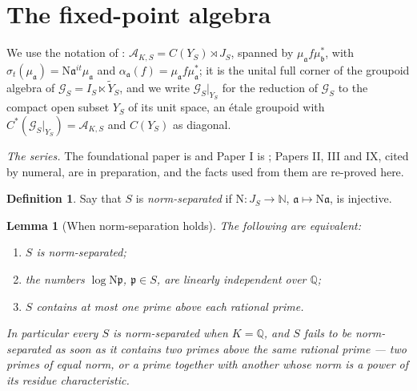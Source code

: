 \documentclass[11pt]{amsart}
\numberwithin{equation}{section}
\newtheorem{lemma}[theorem]{Lemma}
\theoremstyle{definition}
\newtheorem{definition}[theorem]{Definition}
\theoremstyle{remark}
\newcommand{\Q}{\mathbb{Q}}
\newcommand{\R}{\mathbb{R}}
\newcommand{\N}{\mathbb{N}}
\newcommand{\cA}{\mathcal{A}}
\newcommand{\cG}{\mathcal{G}}
\newcommand{\pp}{\mathfrak{p}}
\newcommand{\aaa}{\mathfrak{a}}
\newcommand{\bb}{\mathfrak{b}}
\newcommand{\Ns}{\mathrm{N}}
\begin{document}
\begin{abstract}
We are careful about what is \emph{not} recovered. The system sees only the triple
$\bigl(S,\Ns|_S,G_S\bigr)$ with its Frobenius data; the field $K$ enters only through that
triple, and whether the triple determines $K$ is an arithmetic question we do not settle and
which, for $S=P_K$, belongs to the literature on Bost--Connes reconstruction. The narrow class
number is not recovered by any argument here. The KMS bundle is a weaker invariant than the
groupoid: it sees the simplices and their symmetry, but we see no way to extract the
individual norms from it. Finally, the proposed equivariant classification of the Kirchberg
boundary by $KK_\R$ is not available to us: the classification of flows on Kirchberg algebras
up to cocycle conjugacy is not a settled theory, and we do not assert it.
\end{abstract}

\maketitle

\section{The fixed-point algebra}

We use the notation of \cite{Main}: $\cA_{K,S}=C(Y_S)\rtimes J_S$, spanned by $\mu_\aaa f\mu_\bb^*$,
with $\sigma_t(\mu_\aaa)=\Ns\aaa^{it}\mu_\aaa$ and $\alpha_\aaa(f)=\mu_\aaa f\mu_\aaa^*$; it is
the unital full corner of the groupoid algebra of $\cG_S=I_S\ltimes\widetilde Y_S$, and we
write $\cG_S|_{Y_S}$ for the reduction of $\cG_S$ to the compact open subset $Y_S$ of its
unit space, an \'etale groupoid with $C^*(\cG_S|_{Y_S})=\cA_{K,S}$ and $C(Y_S)$ as diagonal.

\emph{The series.} The foundational paper is \cite{Main} and Paper I is \cite{SeriesI};
Papers II, III and IX, cited by numeral, are in preparation, and the facts used from them
are re-proved here.

\begin{definition}\label{def:injective}
Say that $S$ is \emph{norm-separated} if $\Ns:J_S\to\N$, $\aaa\mapsto\Ns\aaa$, is injective.
\end{definition}

\begin{lemma}[When norm-separation holds]\label{lem:sep}
The following are equivalent:
\begin{enumerate}
\item $S$ is norm-separated;
\item the numbers $\log\Ns\pp$, $\pp\in S$, are linearly independent over $\Q$;
\item $S$ contains at most one prime above each rational prime.
\end{enumerate}
In particular every $S$ is norm-separated when $K=\Q$, and $S$ fails to be norm-separated
as soon as it contains two primes above the same rational prime --- two primes of equal
norm, or a prime together with another whose norm is a power of its residue
characteristic.
\end{lemma}
\end{document}
